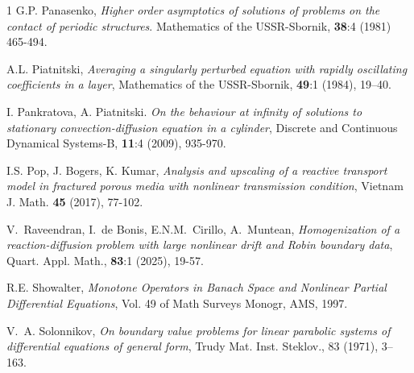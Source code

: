 \documentclass[reqno]{amsart}            %
\numberwithin{equation}{section}
\begin{document}
\begin{thebibliography}{1}
		{G.P. Panasenko,} \textit{Higher order asymptotics of solutions of
			problems on the contact of periodic structures}. {Mathematics of the USSR-Sbornik}, \textbf{38}:4 (1981)  465-494.
		
		A.L. Piatnitski, \textit{Averaging a singularly perturbed equation with rapidly oscillating coefficients in a layer}, Mathematics of
		the USSR-Sbornik, \textbf{49}:1 (1984), 19–40.
		
		
		
		I. Pankratova, A. Piatnitski. \textit{On the behaviour at infinity of solutions to stationary convection-diffusion equation in a cylinder}, Discrete and Continuous Dynamical Systems-B, \textbf{11}:4 (2009), 935-970. %
		
		I.S. Pop, J. Bogers, K. Kumar, \textit{Analysis and upscaling of a reactive transport model
			in fractured porous media with nonlinear transmission condition}, Vietnam J. Math. \textbf{45} (2017), 77-102.
		
		
		V.~Raveendran, I.~de Bonis, E.N.M.~Cirillo, A.~Muntean,
		\textit{Homogenization of a reaction-diffusion problem with large
			nonlinear drift and {R}obin boundary data},
		Quart. Appl. Math., \textbf{83}:1
		(2025), {19-57}.
		
		
		R.E. Showalter, \textit{Monotone Operators in Banach Space and Nonlinear Partial Differential Equations}, Vol. 49 of Math Surveys Monogr, AMS, 1997. 
		
		V.~A. Solonnikov,
		\textit{On boundary value problems for linear parabolic systems of differential equations of general form},
		Trudy Mat. Inst. Steklov., 83 (1971), 3–163.
		
		
	\end{thebibliography}
		
	
\end{document}
